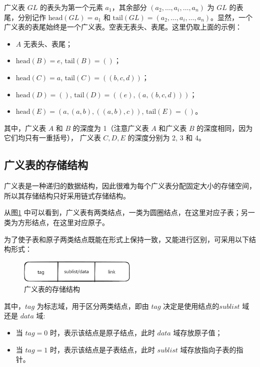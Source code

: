\documentclass[lang=cn,newtx,10pt,scheme=chinese]{../elegantbook}
\begin{document}
广义表 $GL$ 的表头为第一个元素 $a_1$，其余部分 $(a_2, \dots, a_i, \dots, a_n)$ 为 $GL$ 的表尾，分别记作 $\text{head}(GL) = a_1$ 和 $\text{tail}(GL) = (a_2, \dots, a_i, \dots, a_n)$。显然，一个广义表的表尾始终是一个广义表。空表无表头、表尾。这里仍取上面的示例：

\begin{itemize}
  \item $A$ 无表头、表尾；
  \item $\text{head}(B) = e$, $\text{tail}(B) = ()$；
  \item $\text{head}(C) = a$, $\text{tail}(C) = ((b, c, d))$；
  \item $\text{head}(D) = ()$, $\text{tail}(D) = ((e), (a, (b, c, d)))$；
  \item $\text{head}(E) = (a,(a,b),((a,b),c))$, $\text{tail}(E) = ()$。
\end{itemize}

其中，广义表 $A$ 和 $B$ 的深度为 1（注意广义表 $A$ 和广义表 $B$ 的深度相同，因为它们均只有一重括号），
广义表 $C, D, E$ 的深度分别为 2, 3 和 4。

\subsection{广义表的存储结构}

广义表是一种递归的数据结构，因此很难为每个广义表分配固定大小的存储空间，所以其存储结构只好采用链式存储结构。

从图\ref{fig:generalized_table_node} 中可以看到，广义表有两类结点，一类为圆圈结点，在这里对应子表；另一类为方形结点，在这里对应原子。

为了使子表和原子两类结点既能在形式上保持一致，又能进行区别，可采用以下结构形式：

\begin{figure}[!htbp]
  \centering
  \includegraphics[width=0.5\textwidth]{./figure/pdf/cropped/GLStruct.pdf}
  \caption{广义表的存储结构}
  \label{fig:generalized_table_node}
\end{figure}

其中，$tag$ 为标志域，用于区分两类结点，即由 $tag$ 决定是使用结点的$sublist$ 域还是 $data$ 域:

\begin{itemize}
  \item 当 $tag = 0$ 时，表示该结点是原子结点，此时 $data$ 域存放原子值；
  \item 当 $tag = 1$ 时，表示该结点是子表结点，此时 $sublist$ 域存放指向子表的指针。
  \end{itemize}
\end{document}

